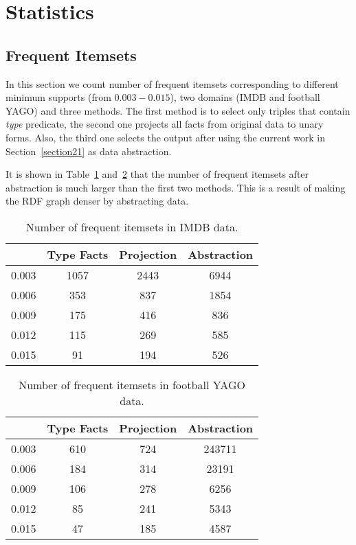 \documentclass{acm_proc_article-sp}
\begin{document}
\section{Statistics}

\subsection{Frequent Itemsets}

In this section we count number of frequent itemsets corresponding to different minimum supports (from $0.003 - 0.015$), two domains (IMDB and football YAGO) and three methods. The first method is to select only triples that contain \textit{type} predicate, the second one projects all facts from original data to unary forms. Also, the third one selects the output after using the current work in Section~\ref{section21} as data abstraction.

It is shown in Table~\ref{table1} and~\ref{table2} that the number of frequent itemsets after abstraction is much larger than the first two methods. This is a result of making the RDF graph denser by abstracting data.

\begin{table}[ht]
\label{table1}
\caption{Number of frequent itemsets in IMDB data.}
\begin{center}
\begin{tabular}{ |c|c|c|c| } 
\hline
 & Type Facts & Projection & Abstraction\\
\hline
0.003 & 1057 & 2443 & 6944 \\
0.006 & 353 & 837 & 1854 \\
0.009 & 175 & 416 & 836 \\
0.012 & 115 & 269 & 585 \\
0.015 & 91 & 194 & 526 \\
\hline
\end{tabular}
\end{center}
\end{table}

\begin{table}[ht]
\caption{Number of frequent itemsets in football YAGO data.}
\label{table2}
\begin{center}
\begin{tabular}{ |c|c|c|c| } 
\hline
 & Type Facts & Projection & Abstraction\\
\hline
0.003 & 610 & 724 & 243711 \\
0.006 & 184 & 314 & 23191 \\
0.009 & 106 & 278 & 6256 \\
0.012 & 85 & 241 & 5343 \\
0.015 & 47 & 185 & 4587 \\
\hline
\end{tabular}
\end{center}
\end{table}
\end{document}
